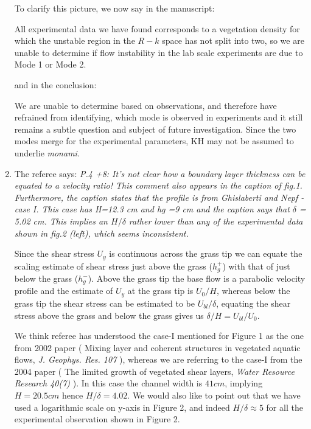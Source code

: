 \documentclass[letterpaper,10pt]{article}
\newcommand{\Rey}{{R}}
\newcommand{\monami}{\textit{monami}}
\newcommand{\revise}[1]{{\color{blue} {#1}}}
\begin{document}
\begin{enumerate}
To clarify this picture, we now say in the manuscript:

\noindent
\revise{All experimental data we have found corresponds to a vegetation density for which the unstable region in the $\Rey-k$ space has not split into two, so we are unable to determine if flow instability in the lab scale experiments \citep{Ghisal02} are due to Mode 1 or Mode 2.}

and in the conclusion:

\noindent
\revise{
We are unable to determine based on observations, and therefore have refrained from identifying, which mode is observed in experiments and it still remains a subtle question and subject of future investigation. Since the two modes merge for the experimental parameters, KH may not be assumed to underlie \monami.
}

\item The referee says:
\textit{
P.4 +8: It's not clear how a boundary layer thickness can be equated to a velocity ratio! This comment also appears in the caption of fig.1. Furthermore, the caption states that the profile is from Ghislaberti and Nepf - case I. This case has H=12.3 cm and hg =9 cm and the caption says that $\delta$
= 5.02 cm. This implies an $H/\delta$ rather lower than any of the experimental
data shown in fig.2 (left), which seems inconsistent.
}

Since the shear stress $U_y$ is continuous across the grass tip we can equate the scaling estimate of shear stress just above the grass  ($h_g^+$) with that of just below the grass ($h_g^{-}$). 
Above the grass tip the base flow is a parabolic velocity profile and the estimate of $U_y$ at the grass tip is $U_0/H$, whereas below the grass tip the shear stress can be estimated to be $U_{bl}/\delta$, equating the shear stress above the grass and below the grass gives us $\delta/H = U_{bl}/U_0$.

We think referee has understood the case-I mentioned for Figure 1 as the one from 2002 paper ( Mixing layer and coherent structures in vegetated aquatic flows, \textit{J. Geophys. Res. 107} ), whereas we are referring to the case-I from the 2004 paper ( The limited growth of vegetated shear layers, \textit{Water Resource Research 40(7)} ). In this case the channel width is $41cm$, implying $H=20.5 cm$ hence $H/\delta=4.02$. We would also like to point out that we have used a logarithmic scale on y-axis in Figure 2, and indeed $H/\delta \approx 5$ for all the experimental observation shown in Figure 2.


\end{enumerate}
\end{document}
